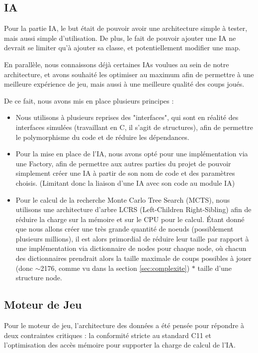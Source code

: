 \documentclass[12pt,a4paper,titlepage,oneside]{article}
\begin{document}
    \subsection{IA}
     \label{sec:iastruc}
    Pour la partie IA, le but était de pouvoir avoir une architecture simple à tester, mais aussi simple d'utilisation. De plus, le fait de pouvoir ajouter une IA ne devrait se limiter qu'à ajouter sa classe, et potentiellement modifier une map.

    En parallèle, nous connaissons déjà certaines IAs voulues au sein de notre architecture, et avons souhaité les optimiser au maximum afin de permettre à une meilleure expérience de jeu, mais aussi à une meilleure qualité des coups joués.

    De ce fait, nous avons mis en place plusieurs principes :
    \begin{itemize}
        \item Nous utilisons à plusieurs reprises des "interfaces", qui sont en réalité des interfaces simulées (travaillant en C, il s'agit de structures), afin de permettre le polymorphisme du code et de réduire les dépendances. 
        \item Pour la mise en place de l'IA, nous avons opté pour une implémentation via une Factory, afin de permettre aux autres parties du projet de pouvoir simplement créer une IA à partir de son nom de code et des paramètres choisis. (Limitant donc la liaison d'une IA avec son code au module IA)
        \item Pour le calcul de la recherche Monte Carlo Tree Search (MCTS), nous utilisons une architecture d'arbre LCRS (Left-Children Right-Sibling) \cite{geekslcrs} afin de réduire la charge sur la mémoire et sur le CPU pour le calcul. Étant donné que nous allons créer une très grande quantité de noeuds (possiblement plusieurs millions), il est alors primordial de réduire leur taille par rapport à une implémentation via dictionnaire de nodes pour chaque node, où chacun des dictionnaires prendrait alors la taille maximale de coups possibles à jouer (donc $\mathtt{\sim}$2176, comme vu dans la section \ref{sec:complexite}) $*$ taille d'une structure node.
    \end{itemize}

    \subsection{Moteur de Jeu}
    Pour le moteur de jeu, l'architecture des données a été pensée pour répondre à deux contraintes critiques : la conformité stricte au standard C11 et l'optimisation des accès mémoire pour supporter la charge de calcul de l'IA. \newline
\end{document}
